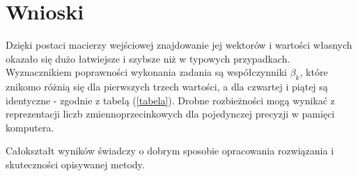\section{Wnioski}

Dzięki postaci macierzy wejściowej znajdowanie jej wektorów i wartości własnych okazało się dużo łatwiejsze i szybsze niż w typowych przypadkach. Wyznacznikiem poprawności wykonania zadania są współczynniki $ \beta_k $, które znikomo różnią się dla pierwszych trzech wartości, a dla czwartej i piątej są identyczne - zgodnie z tabelą (\ref{tabela}). Drobne rozbieżności mogą wynikać z reprezentacji liczb zmiennoprzecinkowych dla pojedynczej precyzji w pamięci komputera.

Całokształt wyników świadczy o dobrym sposobie opracowania rozwiązania i skuteczności opisywanej metody.

